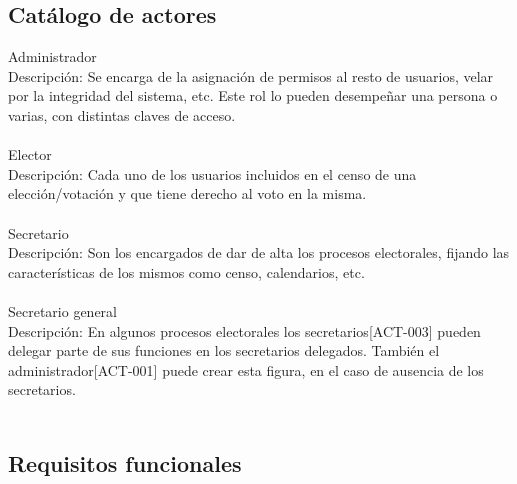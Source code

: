 \documentclass[12pt,letterpaper]{report}
\begin{document}
	\subsection{Catálogo de actores}
		\noindent Administrador\\
		Descripción: Se encarga de la asignación de permisos al resto de usuarios, velar por la integridad del sistema, etc. Este rol lo pueden desempeñar una persona o varias, con distintas claves de acceso.
		\\~\\
		Elector\\
		Descripción: Cada uno de los usuarios incluidos en el censo de una elección/votación y que tiene derecho al voto en la misma.
		\\~\\
		Secretario\\
		Descripción: Son los encargados de dar de alta los procesos electorales, fijando las características de los mismos como censo, calendarios, etc.
		\\~\\
		Secretario general\\
		Descripción: En algunos procesos electorales los secretarios[ACT-003] pueden delegar parte de sus funciones en los secretarios delegados. También el administrador[ACT-001] puede crear esta figura, en el caso de ausencia de los secretarios.
		\\~\\
		
	\subsection{Requisitos funcionales}
	
\end{document}
